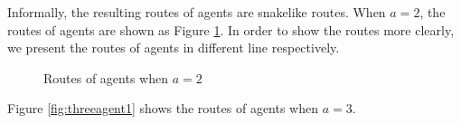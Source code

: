 Informally, the resulting  routes of agents are snakelike routes. When $a=2$, the routes of agents are shown as Figure \ref{fig:twoagent2}. In order to show the routes more clearly, we present the routes of agents in different line respectively.
\begin{figure} [H]
  \centering 
  \caption{Routes of agents when $a=2$} 
  \label{fig:twoagent2} %
\end{figure}
 Figure \ref{fig:threeagent1} shows the routes of agents when $a=3$.
